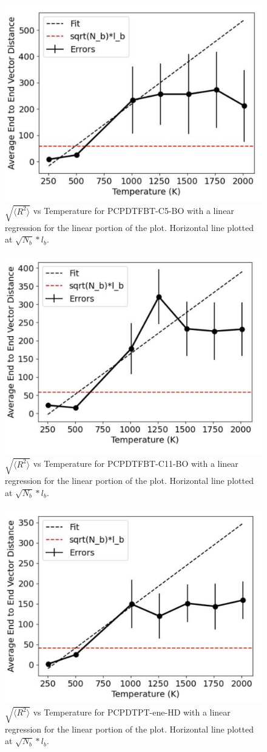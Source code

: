\begin{figure}
    \centering
    \includegraphics[width=0.6\linewidth]{src/figures/pers_l_figs/e-e plots/C5.png}
    \caption{$\sqrt{\langle R^2 \rangle}$ vs Temperature for PCPDTFBT-C5-BO with a linear regression for the linear portion of the plot. Horizontal line plotted at $\sqrt{N_b}*l_b$.}
    \label{fig:e-e_C5}
\end{figure}

\begin{figure}
    \centering
    \includegraphics[width=0.6\linewidth]{src/figures/pers_l_figs/e-e plots/C11.png}
    \caption{$\sqrt{\langle R^2 \rangle}$ vs Temperature for PCPDTFBT-C11-BO with a linear regression for the linear portion of the plot. Horizontal line plotted at $\sqrt{N_b}*l_b$.}
    \label{fig:e-e_C11}
\end{figure}

\begin{figure}
    \centering
    \includegraphics[width=0.6\linewidth]{src/figures/pers_l_figs/e-e plots/ene_HD.png}
    \caption{$\sqrt{\langle R^2 \rangle}$ vs Temperature for PCPDTPT-ene-HD with a linear regression for the linear portion of the plot. Horizontal line plotted at $\sqrt{N_b}*l_b$.}
    \label{fig:e-e_ene_HD}
\end{figure}

